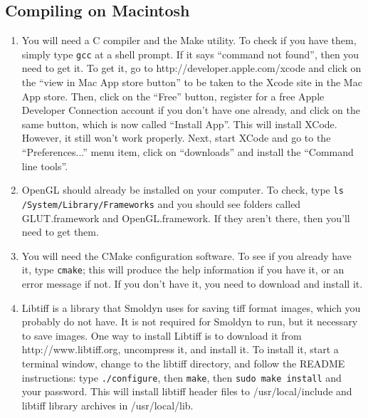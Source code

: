 \documentclass {book}
\newcommand {\ttt} {\texttt}
\begin{document}
\subsection*{Compiling on Macintosh}
\begin{enumerate}
\item You will need a C compiler and the Make utility. To check if you have them, simply type \ttt{gcc} at a shell prompt. If it says ``command not found'', then you need to get it. To get it, go to http://developer.apple.com/xcode and click on the ``view in Mac App store button'' to be taken to the Xcode site in the Mac App store. Then, click on the ``Free'' button, register for a free Apple Developer Connection account if you don't have one already, and click on the same button, which is now called ``Install App''. This will install XCode. However, it still won't work properly. Next, start XCode and go to the ``Preferences...'' menu item, click on ``downloads'' and install the ``Command line tools''.

\item OpenGL should already be installed on your computer. To check, type \ttt{ls /System/Library/Frameworks} and you should see folders called GLUT.framework and OpenGL.framework. If they aren't there, then you'll need to get them.

\item You will need the CMake configuration software. To see if you already have it, type \ttt{cmake}; this will produce the help information if you have it, or an error message if not. If you don't have it, you need to download and install it.

\item Libtiff is a library that Smoldyn uses for saving tiff format images, which you probably do not have. It is not required for Smoldyn to run, but it necessary to save images. One way to install Libtiff is to download it from http://www.libtiff.org, uncompress it, and install it. To install it, start a terminal window, change to the libtiff directory, and follow the README instructions: type \ttt{./configure}, then \ttt{make}, then \ttt{sudo make install} and your password. This will install libtiff header files to /usr/local/include and libtiff library archives in /usr/local/lib.


\end{enumerate}
\end{document}
